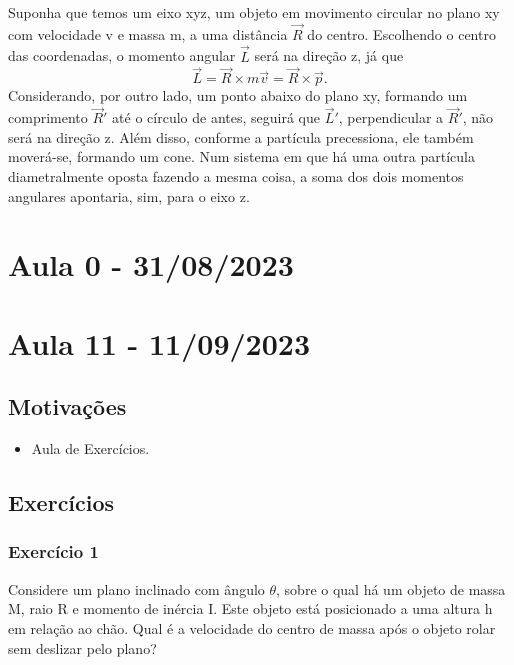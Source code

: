 \documentclass{article}
\begin{document}
  Suponha que temos um eixo xyz, um objeto em movimento circular no plano xy com velocidade v e massa m, a uma distância \(\vec{R}\) do centro.
Escolhendo o centro das coordenadas, o momento angular \(\vec{L}\) será na direção z, já que 
  \[
    \vec{L} = \vec{R}\times m \vec{v} = \vec{R}\times \vec{p}.
  \]
  Considerando, por outro lado, um ponto abaixo do plano xy, formando um comprimento \(\vec{R}'\) até o círculo de antes, seguirá que \(\vec{L}'\), perpendicular a 
 \(\vec{R}'\), não será na direção z. Além disso, conforme a partícula precessiona, ele também moverá-se, formando um cone. Num sistema em que há uma outra partícula diametralmente
 oposta fazendo a mesma coisa, a soma dos dois momentos angulares apontaria, sim, para o eixo z.
\newpage
\section{Aula 0 - 31/08/2023}
\newpage
\section{Aula 11 - 11/09/2023}
\subsection{Motivações}
\begin{itemize}
  \item Aula de Exercícios.
\end{itemize}
\subsection{Exercícios}
\subsubsection{Exercício 1}
  Considere um plano inclinado com ângulo \(\theta \), sobre o qual há um objeto de massa M, raio R e momento de inércia I.
Este objeto está posicionado a uma altura h em relação ao chão. Qual é a velocidade do centro de massa após o objeto rolar sem deslizar pelo plano?
\end{document}
